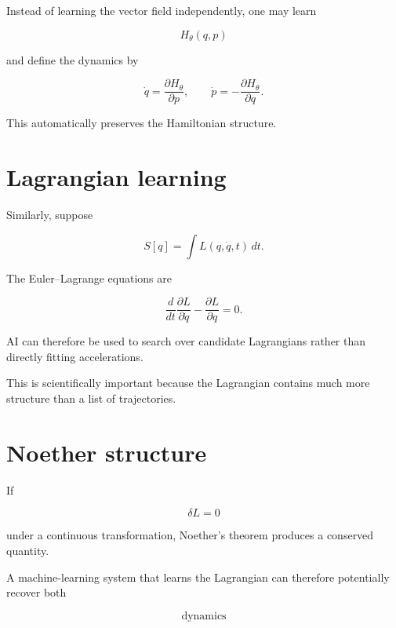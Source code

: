 \documentclass[11pt,a4paper,oneside]{book}
\begin{document}
Instead of learning the vector field independently, one may learn

\begin{equation}
H_\theta(q,p)
\end{equation}

and define the dynamics by

\begin{equation}
\dot{q}
=
\frac{\partial H_\theta}{\partial p},
\qquad
\dot{p}
=
-\frac{\partial H_\theta}{\partial q}.
\end{equation}

This automatically preserves the Hamiltonian structure.

\section{Lagrangian learning}

Similarly, suppose

\begin{equation}
S[q]
=
\int L(q,\dot q,t)\,dt.
\end{equation}

The Euler--Lagrange equations are

\begin{equation}
\frac{d}{dt}
\frac{\partial L}{\partial\dot q}
-
\frac{\partial L}{\partial q}
=0.
\end{equation}

AI can therefore be used to search over candidate Lagrangians rather than
directly fitting accelerations.

This is scientifically important because the Lagrangian contains much more
structure than a list of trajectories.

\section{Noether structure}

If

\begin{equation}
\delta L=0
\end{equation}

under a continuous transformation, Noether's theorem produces a conserved
quantity.

A machine-learning system that learns the Lagrangian can therefore potentially
recover both

\begin{equation}
\text{dynamics}
\end{equation}
\end{document}
